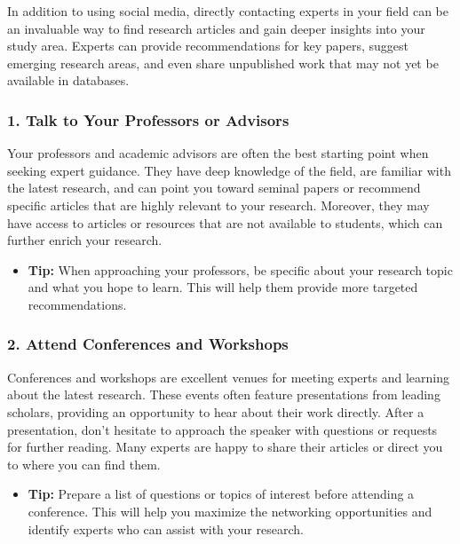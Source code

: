 \documentclass[
]{book}
\providecommand{\tightlist}{%
  \setlength{\itemsep}{0pt}\setlength{\parskip}{0pt}}
\begin{document}
In addition to using social media, directly contacting experts in your field can be an invaluable way to find research articles and gain deeper insights into your study area. Experts can provide recommendations for key papers, suggest emerging research areas, and even share unpublished work that may not yet be available in databases.

\subsubsection*{1. Talk to Your Professors or Advisors}\label{talk-to-your-professors-or-advisors}

Your professors and academic advisors are often the best starting point when seeking expert guidance. They have deep knowledge of the field, are familiar with the latest research, and can point you toward seminal papers or recommend specific articles that are highly relevant to your research. Moreover, they may have access to articles or resources that are not available to students, which can further enrich your research.

\begin{itemize}
\tightlist
\item
  \textbf{Tip:} When approaching your professors, be specific about your research topic and what you hope to learn. This will help them provide more targeted recommendations.
\end{itemize}

\subsubsection*{2. Attend Conferences and Workshops}\label{attend-conferences-and-workshops}

Conferences and workshops are excellent venues for meeting experts and learning about the latest research. These events often feature presentations from leading scholars, providing an opportunity to hear about their work directly. After a presentation, don't hesitate to approach the speaker with questions or requests for further reading. Many experts are happy to share their articles or direct you to where you can find them.

\begin{itemize}
\tightlist
\item
  \textbf{Tip:} Prepare a list of questions or topics of interest before attending a conference. This will help you maximize the networking opportunities and identify experts who can assist with your research.
\end{itemize}
\end{document}
